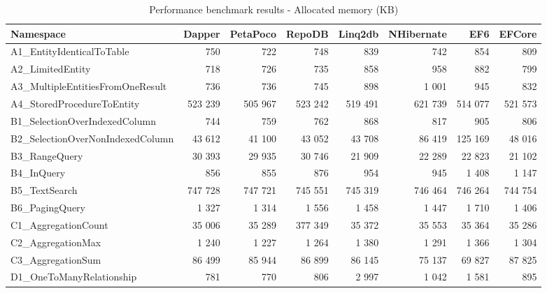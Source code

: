 \clearpage
\begin{landscape}
\begin{table}
\centering
\caption{Performance benchmark results - Allocated memory (KB)}
\label{tab:benchmark_results_memory}
\begin{tabular}{lrrrrrrr}
\toprule
Namespace &   Dapper & PetaPoco &   RepoDB &  Linq2db & NHibernate &        EF6 &     EFCore \\
\midrule
A1\_EntityIdenticalToTable        &      750 &      722 &      748 &      839 &        742 &        854 &        809 \\
A2\_LimitedEntity                 &      718 &      726 &      735 &      858 &        958 &        882 &        799 \\
A3\_MultipleEntitiesFromOneResult &      736 &      736 &      745 &      898 &      1 001 &        945 &        832 \\
A4\_StoredProcedureToEntity       &  523 239 &  505 967 &  523 242 &  519 491 &    621 739 &    514 077 &    521 573 \\
B1\_SelectionOverIndexedColumn    &      744 &      759 &      762 &      868 &        817 &        905 &        806 \\
B2\_SelectionOverNonIndexedColumn &   43 612 &   41 100 &   43 052 &   43 708 &     86 419 &    125 169 &     48 016 \\
B3\_RangeQuery                    &   30 393 &   29 935 &   30 746 &   21 909 &     22 289 &     22 823 &     21 102 \\
B4\_InQuery                       &      856 &      855 &      876 &      954 &        945 &      1 408 &      1 147 \\
B5\_TextSearch                    &  747 728 &  747 721 &  745 551 &  745 319 &    746 464 &    746 264 &    744 754 \\
B6\_PagingQuery                   &    1 327 &    1 314 &    1 556 &    1 458 &      1 447 &      1 710 &      1 406 \\
C1\_AggregationCount              &   35 006 &   35 289 &  377 349 &   35 372 &     35 553 &     35 364 &     35 286 \\
C2\_AggregationMax                &    1 240 &    1 227 &    1 264 &    1 380 &      1 291 &      1 366 &      1 304 \\
C3\_AggregationSum                &   86 499 &   85 944 &   86 899 &   86 145 &     75 137 &     69 827 &     87 825 \\
D1\_OneToManyRelationship         &      781 &      770 &      806 &    2 997 &      1 042 &      1 581 &        895 \\

\end{tabular}
\end{table}
\end{landscape}
